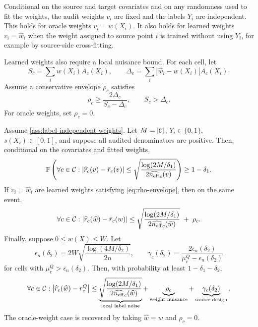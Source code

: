 \begin{assumption}\label{ass:label-independent-weights}
Conditional on the source and target covariates and on any randomness used to fit the weights, the audit weights \(v_i\) are fixed and the labels \(Y_i\) are independent. This holds for oracle weights \(v_i=w(X_i)\). It also holds for learned weights \(v_i=\widehat w_i\) when the weight assigned to source point \(i\) is trained without using \(Y_i\), for example by source-side cross-fitting.
\end{assumption}

Learned weights also require a local nuisance bound. For each cell, let
\[
S_c=\sum_i w(X_i)A_c(X_i),
\qquad
\Delta_c=\sum_i|\widehat w_i-w(X_i)|A_c(X_i).
\]
Assume a conservative envelope \(\rho_c\) satisfies
\begin{equation}\label{eq:rho-envelope}
\rho_c\ge \frac{2\Delta_c}{S_c-\Delta_c},
\qquad S_c>\Delta_c .
\end{equation}
For oracle weights, set \(\rho_c=0\).

\begin{theorem}\label{thm:main-certificate}
Assume \cref{ass:label-independent-weights}. Let \(M=|\mathcal{C}|\), \(Y_i\in\{0,1\}\), \(s(X_i)\in[0,1]\), and suppose all audited denominators are positive. Then, conditional on the covariates and fitted weights,
\[
\mathbb{P}\left(
\forall c\in\mathcal{C}:
\left|\widehat r_c(v)-\bar r_c(v)\right|
\le
\sqrt{\frac{\log(2M/\delta_1)}{2\widehat{n_{\mathrm{eff}}}_c(v)}}
\right)
\ge
1-\delta_1 .
\]
If \(v_i=\widehat w_i\) are learned weights satisfying \cref{eq:rho-envelope}, then on the same event,
\[
\forall c\in\mathcal{C}:
\left|\widehat r_c(\widehat w)-\bar r_c(w)\right|
\le
\sqrt{\frac{\log(2M/\delta_1)}{2\widehat{n_{\mathrm{eff}}}_c(\widehat w)}}
\;+\;\rho_c .
\]
Finally, suppose \(0\le w(X)\le W\). Let
\[
\epsilon_n(\delta_2)=2W\sqrt{\frac{\log(4M/\delta_2)}{2n}},
\qquad
\gamma_c(\delta_2)=
\frac{2\epsilon_n(\delta_2)}{\mu_c^Q-\epsilon_n(\delta_2)}
\]
for cells with \(\mu_c^Q>\epsilon_n(\delta_2)\). Then, with probability at least \(1-\delta_1-\delta_2\),
\[
\forall c\in\mathcal{C}:
\left|\widehat r_c(\widehat w)-r_c^Q\right|
\le
\underbrace{
\sqrt{\frac{\log(2M/\delta_1)}{2\widehat{n_{\mathrm{eff}}}_c(\widehat w)}}
}_{\textnormal{local label noise}}
+
\underbrace{\rho_c}_{\textnormal{weight nuisance}}
+
\underbrace{\gamma_c(\delta_2)}_{\textnormal{source design}}.
\]
The oracle-weight case is recovered by taking \(\widehat w=w\) and \(\rho_c=0\).
\end{theorem}

